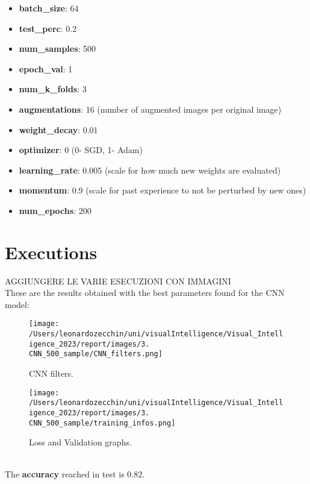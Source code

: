 \documentclass{report}
\begin{document}
\begin{itemize}
    \item \textbf{batch\_size}: 64
    \item \textbf{test\_perc}: 0.2
    \item \textbf{num\_samples}: 500 
    \item \textbf{epoch\_val}: 1
    \item \textbf{num\_k\_folds}: 3
    \item \textbf{augmentations}: 16 (number of augmented images per original image)
    \item \textbf{weight\_decay}: 0.01
    \item \textbf{optimizer}: 0 (0- SGD, 1- Adam)
    \item \textbf{learning\_rate}: 0.005 (scale for how much new weights are evaluated)
    \item \textbf{momentum}: 0.9 (scale for past experience to not be perturbed by new ones)
    \item \textbf{num\_epochs}: 200 
\end{itemize}
\pagebreak
\section{Executions}
AGGIUNGERE LE VARIE ESECUZIONI CON IMMAGINI\\

These are the results obtained with the best parameters found for the CNN model:
\begin{figure}[ht!]
    \centering
    \begin{minipage}[b]{0.7\linewidth}
      \texttt{[image: /Users/leonardozecchin/uni/visualIntelligence/Visual\_Intelligence\_2023/report/images/3. CNN\_500\_sample/CNN\_filters.png]}
      \caption{CNN filters.}
      \label{fig:image1}
    \end{minipage}
    \hspace{0.5cm}
    \begin{minipage}[b]{0.7\linewidth}
      \texttt{[image: /Users/leonardozecchin/uni/visualIntelligence/Visual\_Intelligence\_2023/report/images/3. CNN\_500\_sample/training\_infos.png]}
      \caption{Loss and Validation graphs.}
      \label{fig:image2}
    \end{minipage}
\end{figure}\\
The \textbf{accuracy} reached in test is $0.82$.\\
\pagebreak
\end{document}
